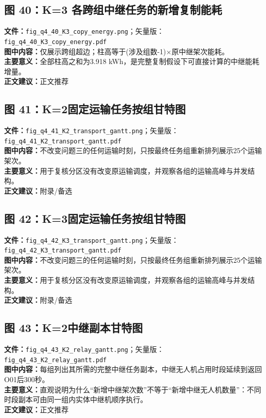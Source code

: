 \subsection*{图 40：K=3 各跨组中继任务的新增复制能耗}
\textbf{文件：}\texttt{fig\_q4\_40\_K3\_copy\_energy.png}；矢量版：\texttt{fig\_q4\_40\_K3\_copy\_energy.pdf}\\
\textbf{图中内容：}仅展示跨组超边；柱高等于(涉及组数-1)×原中继架次能耗。\\
\textbf{主要意义：}全部柱高之和为3.918 kWh，是完整复制假设下可直接计算的中继能耗增量。\\
\textbf{正文建议：}正文推荐

\subsection*{图 41：K=2固定运输任务按组甘特图}
\textbf{文件：}\texttt{fig\_q4\_41\_K2\_transport\_gantt.png}；矢量版：\texttt{fig\_q4\_41\_K2\_transport\_gantt.pdf}\\
\textbf{图中内容：}不改变问题三的任何运输时刻，只按最终任务组重新排列展示25个运输架次。\\
\textbf{主要意义：}用于复核分区没有改变原运输调度，并观察各组的运输高峰与并发结构。\\
\textbf{正文建议：}附录/备选

\subsection*{图 42：K=3固定运输任务按组甘特图}
\textbf{文件：}\texttt{fig\_q4\_42\_K3\_transport\_gantt.png}；矢量版：\texttt{fig\_q4\_42\_K3\_transport\_gantt.pdf}\\
\textbf{图中内容：}不改变问题三的任何运输时刻，只按最终任务组重新排列展示25个运输架次。\\
\textbf{主要意义：}用于复核分区没有改变原运输调度，并观察各组的运输高峰与并发结构。\\
\textbf{正文建议：}附录/备选

\subsection*{图 43：K=2中继副本甘特图}
\textbf{文件：}\texttt{fig\_q4\_43\_K2\_relay\_gantt.png}；矢量版：\texttt{fig\_q4\_43\_K2\_relay\_gantt.pdf}\\
\textbf{图中内容：}每组列出其所需的完整中继任务副本，中继无人机占用时段延续到返回O01后300秒。\\
\textbf{主要意义：}直观说明为什么“新增中继架次数”不等于“新增中继无人机数量”：不同时段副本可由同一组内实体中继机顺序执行。\\
\textbf{正文建议：}正文推荐

